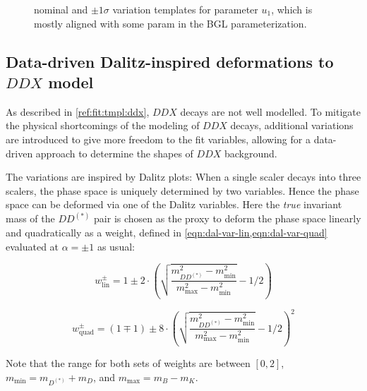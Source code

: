 \begin{figure}[!htb]

    \caption{
        \Dz\mun nominal and $\pm 1\sigma$ variation templates for
        parameter $u_1$, which is mostly aligned with
        some param in the BGL parameterization.
    }
    \label{fig:fit-variations:ff}
\end{figure}


\subsection{Data-driven Dalitz-inspired deformations to $DDX$ model}
\label{ref:fit:var:ddx}

As described in \cref{ref:fit:tmpl:ddx}, $DDX$ decays are not well modelled.
To mitigate the physical shortcomings of the modeling of $DDX$ decays,
additional variations are introduced to give more freedom to the fit variables,
allowing for a data-driven approach to determine the shapes of $DDX$ background.

The variations are inspired by Dalitz plots:
When a single scaler decays into three scalers,
the phase space is uniquely determined by two variables.
Hence the phase space can be deformed via one of the Dalitz variables.
Here the \emph{true} invariant mass of the $DD^{(*)}$ pair is chosen as the
proxy to deform the phase space linearly and quadratically
as a weight, defined in \cref{eqn:dal-var-lin,eqn:dal-var-quad} evaluated at
$\alpha = \pm 1$ as usual:

\begin{equation}
    w_\text{lin}^\pm = 1 \pm 2 \cdot \left(\sqrt{
        \frac{m_{DD^{(*)}}^2 - m_\text{min}^2}{m_\text{max}^2 - m_\text{min}^2}
    } - 1/2 \right)
    \label{eqn:dal-var-lin}
\end{equation}

\begin{equation}
    w_\text{quad}^\pm = (1 \mp 1) \pm 8 \cdot
    \left(\sqrt{
        \frac{m_{DD^{(*)}}^2 - m_\text{min}^2}{m_\text{max}^2 - m_\text{min}^2}
    } - 1/2 \right)^2
    \label{eqn:dal-var-quad}
\end{equation}

Note that the range for both sets of weights are between $[0, 2]$,
$m_\text{min} = m_{D^{(*)}} + m_D$, and $m_\text{max} = m_B - m_K$.


